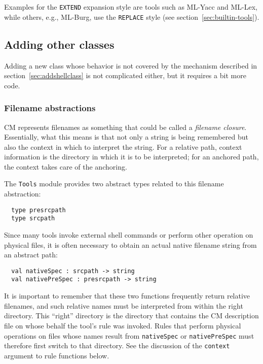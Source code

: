 Examples for the {\tt EXTEND} expansion style are tools such as
ML-Yacc and ML-Lex, while others, e.g., ML-Burg, use the {\tt REPLACE}
style (see section~\ref{sec:builtin-tools}).

\subsection{Adding other classes}

Adding a new class whose behavior is not covered by the mechanism
described in section~\ref{sec:addshellclass} is not complicated
either, but it requires a bit more code.

\subsubsection{Filename abstractions}

CM represents filenames as something that could be called a {\em
filename closure}.  Essentially, what this means is that not only a
string is being remembered but also the context in which to interpret
the string.  For a relative path, context information is the directory
in which it is to be interpreted; for an anchored path, the context
takes care of the anchoring.

The {\tt Tools} module provides two abstract types related to this
filename abstraction:

\begin{lstlisting}
  type presrcpath
  type srcpath
\end{lstlisting}%

Since many tools invoke external shell commands or perform other
operation on physical files, it is often necessary to obtain an actual
native filename string from an abstract path:

\begin{lstlisting}
  val nativeSpec : srcpath -> string
  val nativePreSpec : presrcpath -> string
\end{lstlisting}%

It is important to remember that these two functions frequently return
relative filenames, and such relative names must be interpreted from
within the right directory.  This ``right'' directory is the directory
that contains the CM description file on whose behalf the tool's rule
was invoked.  Rules that perform physical operations on files whose
names result from {\tt nativeSpec} or {\tt nativePreSpec} must
therefore first switch to that directory.  See the discussion of the
{\tt context} argument to rule functions below.

